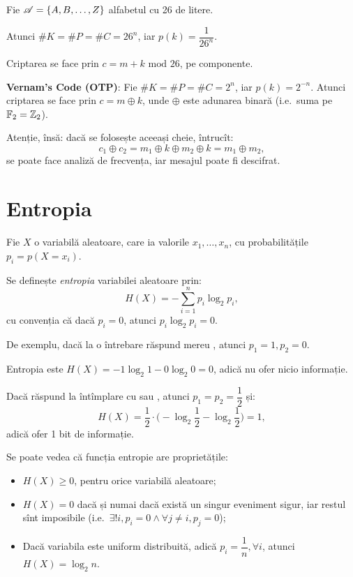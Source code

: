 \begin{example}
  Fie $ \mathscr{A} = \{ A, B, \dots, Z \} $ alfabetul cu 26 de litere.

  Atunci $ \# K = \# P = \# C = 26^n $, iar $ p(k) = \dfrac{1}{26^n} $.

  Criptarea se face prin $ c = m + k \text{ mod } 26 $, pe componente.
\end{example}

\begin{example}
  \textbf{Vernam's Code (OTP)}: Fie $ \# K = \# P = \# C = 2^n $,
  iar $ p(k) = 2^{-n} $. Atunci criptarea se face prin $ c = m \oplus k $,
  unde $ \oplus $ este adunarea binară (i.e.\ suma pe $ \mathbb{F}_2 = \mathbb{Z}_2 $).

  Atenție, însă: dacă se folosește aceeași cheie, întrucît:
  \[
    c_1 \oplus c_2 = m_1 \oplus k \oplus m_2 \oplus k = m_1 \oplus m_2,
  \]
  se poate face analiză de frecvența, iar mesajul poate fi descifrat.
\end{example}

\section{Entropia}

\begin{definition}\label{def:entropie}
  Fie $ X $ o variabilă aleatoare, care ia valorile $ x_1, \dots, x_n $, cu
  probabilitățile $ p_i = p(X = x_i) $.

  Se definește \emph{entropia} variabilei aleatoare prin:
  \[
    H(X) = - \sum_{i = 1}^n p_i \log_2 p_i,
  \]
  cu convenția că dacă $ p_i = 0 $, atunci $ p_i \log_2 p_i = 0 $.
\end{definition}

De exemplu, dacă la o întrebare răspund mereu , atunci $ p_1 = 1, p_2 = 0 $.

Entropia este $ H(X) = -1 \log_2 1 - 0 \log_2 0 = 0 $, adică nu ofer nicio informație.

Dacă răspund la întîmplare cu  sau , atunci $ p_1 = p_2 = \dfrac{1}{2} $
și:
\[
  H(X) = \frac{1}{2} \cdot \Big( -\log_2 \frac{1}{2} - \log_2 \frac{1}{2} \Big) = 1,
\]
adică ofer 1 bit de informație.

Se poate vedea că funcția entropie are proprietățile:
\begin{itemize}
\item $ H(X) \geq 0 $, pentru orice variabilă aleatoare;
\item $ H(X) = 0 $ dacă și numai dacă există un singur eveniment sigur,
  iar restul sînt imposibile (i.e.\ $ \exists! i, p_i = 0 \land \forall j \neq i, p_j = 0 $);
\item Dacă variabila este uniform distribuită, adică $ p_i = \dfrac{1}{n}, \forall i $,
  atunci $ H(X) = \log_2 n $.
\end{itemize}

